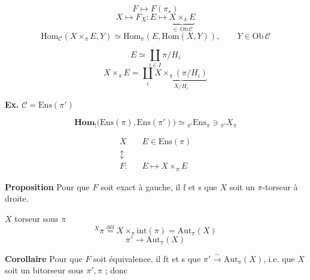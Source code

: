 \documentclass[11pt,a4paper]{article}
\begin{document}
\[
F \longmapsto F(\pi_s)
\]
\[
X \longmapsto F_X : E \longmapsto \underbrace{X \times_{\pi} E}_{\in\, \mathrm{Ob}\,\mathcal{C}}
\]
\[
\mathrm{Hom}_{\mathcal{C}}(X \times_{\pi} E, Y) \simeq \mathrm{Hom}_{\pi}(E, \mathrm{Hom}(X, Y)),
\qquad Y \in \mathrm{Ob}\,\mathcal{C}
\]


\[
E \simeq \coprod_{i \in I} \pi/H_i
\]
\[
X \times_{\pi} E = \coprod_i \underbrace{X \times_{\pi} (\pi/H_i)}_{X/H_i}
\]


\textbf{Ex.} $\mathcal{C} = \mathrm{Ens}(\pi')$

\[
\mathbf{Hom}_{!}\bigl(\mathrm{Ens}(\pi), \mathrm{Ens}(\pi')\bigr) \simeq {}_{\pi'}\mathrm{Ens}_{\pi}
\ni {}_{\pi'}X_{\pi}
\]


\[
\begin{array}{ccl}
X & & E \in \mathrm{Ens}(\pi) \\
\updownarrow & & \\
F : & & E \longmapsto X \times_{\pi} E
\end{array}
\]

\textbf{Proposition} Pour que $F$ soit exact à gauche, il f et
s que $X$ soit un $\pi$-torseur à droite.


$X$ torseur sous $\pi$
\[
{}^{X}\pi \overset{\text{déf}}{=} X \times_{\pi} \mathrm{int}(\pi) = \mathrm{Aut}_{\pi}(X)
\]
\[
\pi' \longrightarrow \mathrm{Aut}_{\pi}(X)
\]

\textbf{Corollaire} Pour que $F$ soit équivalence, il ft et
s que $\pi' \xrightarrow{\sim} \mathrm{Aut}_{\pi}(X)$, i.e. que $X$
soit un bitorseur sous $\pi', \pi$ ; donc


\end{document}
